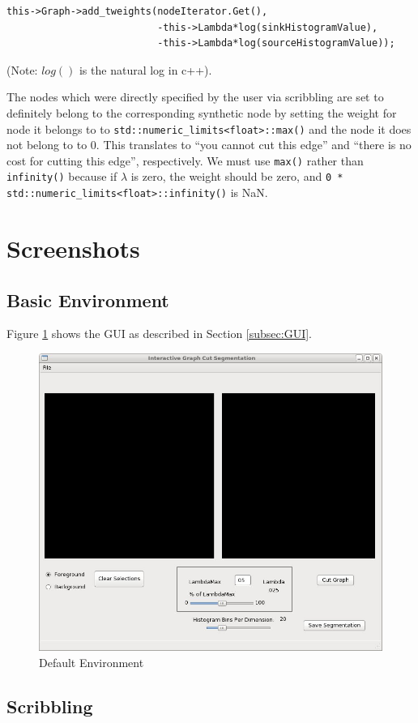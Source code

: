 \documentclass{InsightArticle}
\begin{document}
\begin{verbatim}
this->Graph->add_tweights(nodeIterator.Get(),
                          -this->Lambda*log(sinkHistogramValue),
                          -this->Lambda*log(sourceHistogramValue));
\end{verbatim}
(Note: $log()$ is the natural log in c++).

The nodes which were directly specified by the user via scribbling are set to definitely belong to the corresponding synthetic node by setting the weight for node it belongs to to \verb|std::numeric_limits<float>::max()| and the node it does not belong to to $0$. This translates to ``you cannot cut this edge'' and ``there is no cost for cutting this edge'', respectively. We must use \verb|max()| rather than \verb|infinity()| because if $\lambda$ is zero, the weight should be zero, and \verb|0 *  std::numeric_limits<float>::infinity()| is NaN.

\section{Screenshots}
\subsection{Basic Environment}
Figure \ref{fig:Environment} shows the GUI as described in Section \ref{subsec:GUI}.

\begin{center}
	\begin{figure}[H]
  \centering
		\includegraphics[width=0.6\linewidth]{images/Environment}
		\caption{Default Environment}
		\label{fig:Environment}
	\end{figure}
\end{center} 

\subsection{Scribbling}
\end{document}
